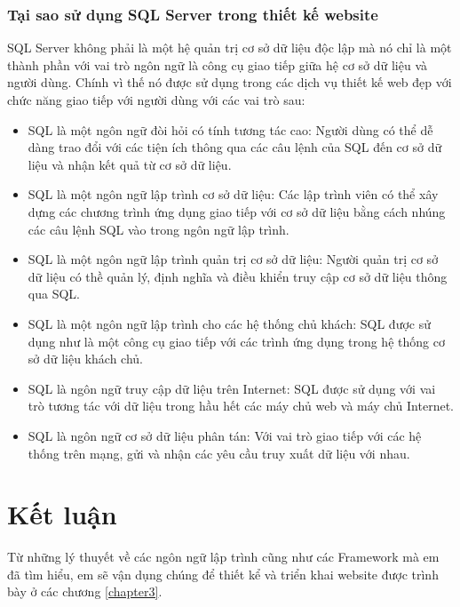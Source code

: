 \subsubsection{Tại sao sử dụng SQL Server trong thiết kế website}
SQL Server không phải là một hệ quản trị cơ sở dữ liệu độc lập mà nó chỉ là một thành phần với vai trò ngôn ngữ là công cụ giao tiếp giữa hệ cơ sở dữ liệu và người dùng. Chính vì thế nó được sử dụng trong các dịch vụ thiết kế web đẹp với chức năng giao tiếp với người dùng với các vai trò sau:
\begin{itemize}
\item	SQL là một ngôn ngữ đòi hỏi có tính tương tác cao: Người dùng có thể dễ dàng trao đổi với các tiện ích thông qua các câu lệnh của SQL đến cơ sở dữ liệu và nhận kết quả từ cơ sở dữ liệu.
\item	SQL là một ngôn ngữ lập trình cơ sở dữ liệu: Các lập trình viên có thể xây dựng các chương trình ứng dụng giao tiếp với cơ sở dữ liệu bằng cách nhúng các câu lệnh SQL vào trong ngôn ngữ lập trình.
\item	SQL là một ngôn ngữ lập trình quản trị cơ sở dữ liệu: Người quản trị cơ sở dữ liệu có thề quản lý, định nghĩa và điều khiển truy cập cơ sở dữ liệu thông qua SQL.
\item	SQL là một ngôn ngữ lập trình cho các hệ thống chủ khách: SQL được sử dụng như là một công cụ giao tiếp với các trình ứng dụng trong hệ thống cơ sở dữ liệu khách chủ.
\item	SQL là ngôn ngữ truy cập dữ liệu trên Internet: SQL được sử dụng với vai trò tương tác với dữ liệu trong hầu hết các máy chủ web và máy chủ Internet.
\item	SQL là ngôn ngữ cơ sở dữ liệu phân tán: Với vai trò giao tiếp với các hệ thống trên mạng, gửi và nhận các yêu cầu truy xuất dữ liệu với nhau.

\end{itemize}

\section{Kết luận}
Từ những lý thuyết về các ngôn ngữ lập trình cũng như các Framework mà em đã tìm hiểu, em sẽ vận dụng chúng để thiết kể và triển khai website được trình bày ở các chương \ref{chapter3}.

 




